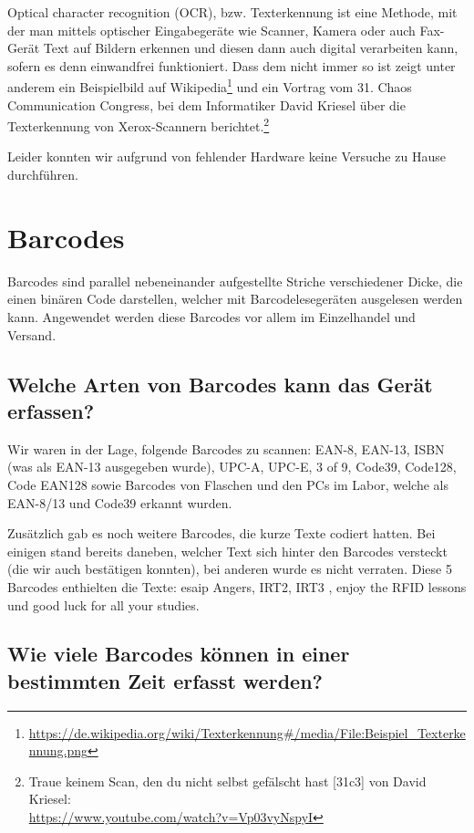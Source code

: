 \documentclass[paper=a4,fontsize=11pt,headsepline,footsepline,parskip=half]{scrartcl}
\begin{document}
\begin{titlepage}
Optical character recognition (OCR), bzw. Texterkennung ist eine Methode, mit der man mittels optischer
Eingabegeräte wie Scanner, Kamera oder auch Fax-Gerät Text auf Bildern erkennen und diesen dann auch
digital verarbeiten kann, sofern es denn einwandfrei funktioniert. Dass dem nicht immer so ist zeigt
unter anderem ein Beispielbild auf Wikipedia\footnote{\url{https://de.wikipedia.org/wiki/Texterkennung\#/media/File:Beispiel_Texterkennung.png}}
und ein Vortrag vom 31. Chaos Communication Congress, bei dem Informatiker David Kriesel über die Texterkennung
von Xerox-Scannern berichtet.\footnote{Traue keinem Scan, den du nicht selbst gefälscht hast [31c3] von David Kriesel:\\ \url{https://www.youtube.com/watch?v=Vp03vyNspyI}}

Leider konnten wir aufgrund von fehlender Hardware keine Versuche zu Hause durchführen.

\end{titlepage}

\section{Barcodes}

Barcodes sind parallel nebeneinander aufgestellte Striche verschiedener Dicke, die einen binären Code darstellen,
welcher mit Barcodelesegeräten ausgelesen werden kann. Angewendet werden diese Barcodes vor allem im Einzelhandel und Versand.

\subsection{Welche Arten von Barcodes kann das Gerät erfassen?}

Wir waren in der Lage, folgende Barcodes zu scannen: EAN-8, EAN-13, ISBN (was als EAN-13 ausgegeben wurde),
UPC-A, UPC-E, 3 of 9, Code39, Code128, Code EAN128 sowie Barcodes von Flaschen und den PCs im Labor, welche als EAN-8/13 und Code39 erkannt wurden.

Zusätzlich gab es noch weitere Barcodes, die kurze Texte codiert hatten. Bei einigen stand bereits daneben, welcher Text sich hinter den Barcodes
versteckt (die wir auch bestätigen konnten), bei anderen wurde es nicht verraten. Diese 5 Barcodes enthielten die Texte:
\glqq esaip Angers\grqq{}, \glqq IRT2\grqq{}, \glqq IRT3 \grqq{}, \glqq enjoy the RFID lessons\grqq{} und \glqq good luck for all your studies\grqq{}.

\subsection{Wie viele Barcodes können in einer bestimmten Zeit erfasst werden?}
\end{document}
